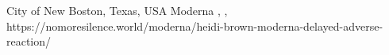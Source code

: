           {City of New Boston, Texas, USA}
          {}
          {Moderna}
          {}
          {
            ,
            ,
          }
          {https://nomoresilence.world/moderna/heidi-brown-moderna-delayed-adverse-reaction/}

